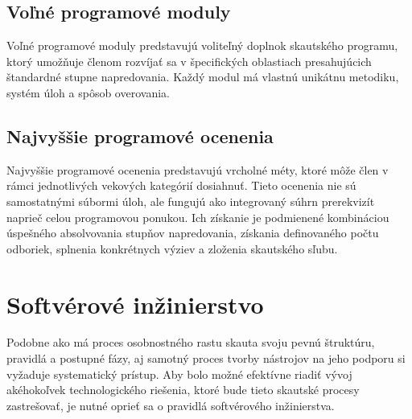 \subsection{Voľné programové moduly}
Voľné programové moduly predstavujú voliteľný doplnok skautského programu, ktorý umožňuje členom rozvíjať sa v špecifických oblastiach presahujúcich štandardné stupne napredovania. Každý modul má vlastnú unikátnu metodiku, systém úloh a spôsob overovania.\cite{noauthor_volne_2025}

\subsection{Najvyššie programové ocenenia}
Najvyššie programové ocenenia predstavujú vrcholné méty, ktoré môže člen v rámci jednotlivých vekových kategórií dosiahnuť. Tieto ocenenia nie sú samostatnými súbormi úloh, ale fungujú ako integrovaný súhrn prerekvizít naprieč celou programovou ponukou. Ich získanie je podmienené kombináciou úspešného absolvovania stupňov napredovania, získania definovaného počtu odboriek, splnenia konkrétnych výziev a zloženia skautského sľubu.\cite{noauthor_najvyssie_2025}

\section{Softvérové inžinierstvo}
Podobne ako má proces osobnostného rastu skauta svoju pevnú štruktúru, pravidlá a postupné fázy, aj samotný proces tvorby nástrojov na jeho podporu si vyžaduje systematický prístup. Aby bolo možné efektívne riadiť vývoj akéhokoľvek technologického riešenia, ktoré bude tieto skautské procesy zastrešovať, je nutné oprieť sa o pravidlá softvérového inžinierstva.

